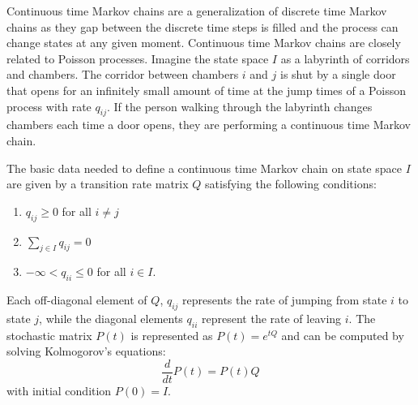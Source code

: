 \begin{itemize}
	Continuous time Markov chains are a generalization of discrete time Markov chains as they
	gap between the discrete time steps is filled and the process can change states at any given moment.
	Continuous time Markov chains are closely related to Poisson processes. Imagine the state
	space $I$ as a labyrinth of corridors and chambers. The corridor between chambers $i$ and $j$
	is shut by a single door that opens for an infinitely small amount of time at the jump times of
	a Poisson process with rate $q_{ij}$. If the person walking through the labyrinth changes
	chambers each time a door opens, they are performing
	a continuous time Markov chain.
	
	The basic data needed to define a continuous time Markov chain on state space $I$ are
	given by a transition rate matrix $Q$ satisfying the following conditions:
	
	\begin{enumerate}
		\item $q_{ij} \ge 0$ for all $i \ne j$
		\item $\sum_{j \in I} q_{ij} = 0$
		\item $-\infty < q_{ii} \le 0$ for all $i \in I$.
	\end{enumerate}
	
	Each off-diagonal element of $Q$, $q_{ij}$ represents the rate of jumping from state $i$ to state $j$,
	while the diagonal elements $q_{ii}$ represent the rate of leaving $i$. The stochastic matrix
	$P(t)$ is represented as $P(t) = e^{tQ}$ and can be computed by solving Kolmogorov's equations:
	\begin{equation}
		\frac{d}{dt}P(t) = P(t)Q
	\end{equation}
	with initial condition $P(0) = I$.

\end{itemize}